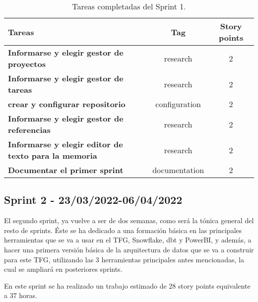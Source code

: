 \begin{table}[ht!]
    \centering
    \resizebox{15cm}{!} {
    \begin{tabular}{|l|c|c|}
    \hline
    \textbf{Tareas}     &\textbf{Tag}     & \textbf{Story points} \\ \hline
    \textbf{Informarse y elegir gestor de proyectos}         &research      &2 \\ \hline 
    \textbf{Informarse y elegir gestor de tareas}         &research      &2 \\ \hline
    \textbf{crear y configurar repositorio}         &configuration      &2 \\ \hline 
    \textbf{Informarse y elegir gestor de referencias}         &research      &2 \\ \hline 
    \textbf{Informarse y elegir editor de texto para la memoria}         &research      &2 \\ \hline 
    \textbf{Documentar el primer sprint}         &{documentation}      &2 \\ \hline 
    \end{tabular}}
    \caption{Tareas completadas del Sprint 1.}
    \label{tab:my_label}
\end{table}
\newpage
\subsection{Sprint 2 - 23/03/2022-06/04/2022}
El segundo sprint, ya vuelve a ser de dos semanas, como será la tónica general del resto de sprints. Éste se ha dedicado a una formación básica en las principales herramientas que se va a usar en el TFG, Snowflake, dbt y PowerBI, y además, a hacer una primera versión básica de la arquitectura de datos que se va a construir para este TFG, utilizando las 3 herramientas principales antes mencionadas, la cual se ampliará en posteriores sprints.


En este sprint se ha realizado un trabajo estimado de 28 story points equivalente a 37 horas.

